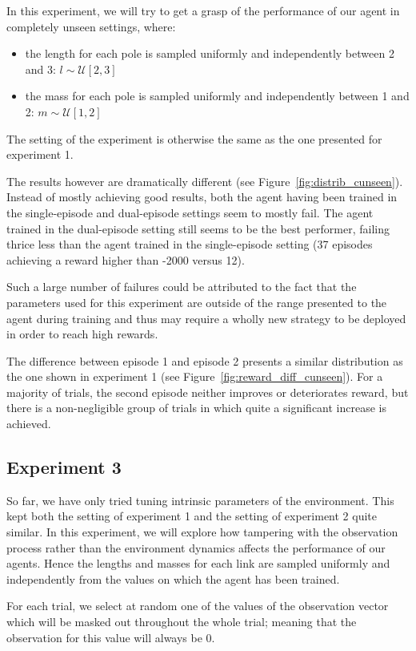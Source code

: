 \documentclass[letterpaper]{article}
\begin{document}
In this experiment, we will try to get a grasp of the performance of our agent
in completely unseen settings, where:
\begin{itemize}
	\item the length for each pole is sampled uniformly and independently 
		between 2 and 3:
		$l \sim \mathcal{U}[2, 3] $
	\item the mass for each pole is sampled uniformly and independently 
		between 1 and 2:
		$m \sim \mathcal{U}[1, 2] $
\end{itemize}

The setting of the experiment is otherwise the same as the one presented for
experiment 1.

The results however are dramatically different (see
Figure~\ref{fig:distrib_cunseen}). Instead of mostly
achieving good results, both the agent having been trained in the single-episode
and dual-episode settings seem to mostly fail. The agent trained
in the dual-episode setting still seems to be the best performer, failing thrice
less than the agent trained in the single-episode setting (37 episodes
achieving a reward higher than -2000 versus 12).

Such a large number of failures could be attributed to the fact that the
parameters used for this experiment are outside of the range presented to
the agent during training and thus may require a wholly new strategy to be
deployed in order to reach high rewards.

The difference between episode 1 and episode 2 presents a similar distribution
as the one shown in experiment 1 (see Figure~\ref{fig:reward_diff_cunseen}). 
For a majority of trials, the second episode
neither improves or deteriorates reward, but there is a non-negligible group
of trials in which quite a significant increase is achieved.

\subsection{Experiment 3}
So far, we have only tried tuning intrinsic parameters of the environment. This
kept both the setting of experiment 1 and the setting of experiment 2 quite
similar. In this experiment, we will explore how tampering with the
observation process rather than the environment dynamics affects the performance
of our agents. Hence the lengths and masses for each link are sampled 
uniformly and independently from the values on which the agent has been trained.

For each trial, we select at random one of the values of the observation vector
which will be masked out throughout the whole trial; meaning that the
observation for this value will always be 0. 
\end{document}
